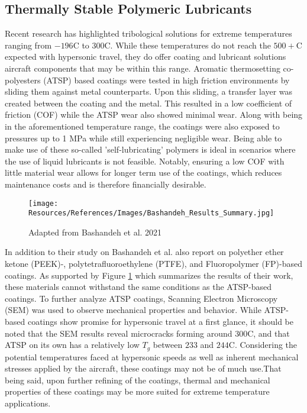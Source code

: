 \documentclass[12pt]{article}
\begin{document}
\begin{multicols}{2}
\subsection{Thermally Stable Polymeric Lubricants}

\indent Recent research has highlighted tribological solutions for extreme temperatures ranging from $-196$\degree C to $300$\degree C. While these temperatures do not reach the $500+$\degree C expected with hypersonic travel, they do offer coating and lubricant solutions aircraft components that may be within this range. Aromatic thermosetting co-polyesters (ATSP) based coatings were tested in high friction environments by sliding them against metal counterparts. Upon this sliding, a transfer layer was created between the coating and the metal. This resulted in a low coefficient of friction (COF) while the ATSP wear also showed minimal wear. Along with being in the aforementioned temperature range, the coatings were also exposed to pressures up to 1 MPa while still experiencing negligible wear. \citep{Bashandeh2021} Being able to make use of these so-called 'self-lubricating' polymers is ideal in scenarios where the use of liquid lubricants is not feasible. Notably, ensuring a low COF with little material wear allows for longer term use of the coatings, which reduces maintenance costs and is therefore financially desirable.

\begin{figure}[H]
    \centering
    \texttt{[image: Resources/References/Images/Bashandeh\_Results\_Summary.jpg]}
    \caption{\scriptsize{Adapted from Bashandeh et al. 2021 \citep{Bashandeh2021}}}
    \label{fig:Bashandeh-Summary}
\end{figure}

\indent In addition to their study on Bashandeh et al. also report on polyether ether ketone (PEEK)-, polytetrafluoroethylene (PTFE), and Fluoropolymer (FP)-based coatings. As supported by Figure \ref{fig:Bashandeh-Summary} which summarizes the results of their work, these materials cannot withstand the same conditions as the ATSP-based coatings. To further analyze ATSP coatings, Scanning Electron Microscopy (SEM) was used to observe mechanical properties and behavior. While ATSP-based coatings show promise for hypersonic travel at a first glance, it should be noted that the SEM results reveal microcracks forming around 300\degree C, and that ATSP on its own has a relatively low $T_g$ between $233$ and $244$\degree C. Considering the potential temperatures faced at hypersonic speeds as well as inherent mechanical stresses applied by the aircraft, these coatings may not be of much use.That being said, upon further refining of the coatings, thermal and mechanical properties of these coatings may be more suited for extreme temperature applications. 


\end{multicols}
\end{document}
